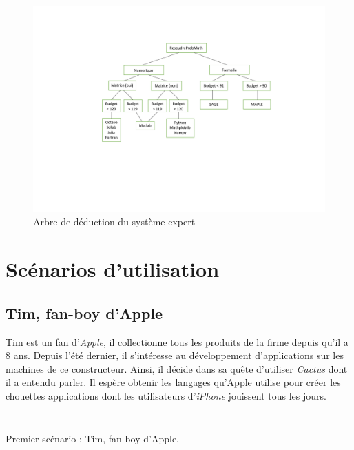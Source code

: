 \documentclass[a4paper,12pt]{article}
\begin{document}
	\begin{figure}[H]
		\centering
		\includegraphics[scale=0.6]{graph_deduction2.pdf}
		\caption{Arbre de déduction du système expert}
	\end{figure}

\section{Scénarios d'utilisation}

	\subsection{Tim, fan-boy d'Apple}
	
	Tim est un fan d'\textit{Apple}, il collectionne tous les produits de la firme depuis qu'il a 8 ans. Depuis l'été dernier, il s'intéresse au développement d'applications sur les machines de ce constructeur. Ainsi, il décide dans sa quête d'utiliser \textit{Cactus} dont il a entendu parler. Il espère obtenir les langages qu'Apple utilise pour créer les chouettes applications dont les utilisateurs d'\textit{iPhone} jouissent tous les jours.

\begin{listing}[H]
	\centering
	\inputminted[breaklines=true,linenos,lastline=29]{text}{../scenarioTim.txt}
\end{listing}
	
\begin{listing}[H]
	\centering
	\inputminted[breaklines=true,linenos,firstline=30]{text}{../scenarioTim.txt}
	\caption{Premier scénario : Tim, fan-boy d'Apple.}
\end{listing}
\end{document}

